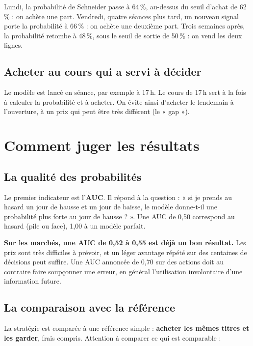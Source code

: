 \documentclass[11pt,a4paper]{article}
\begin{document}
\begin{exemple}
Lundi, la probabilité de Schneider passe à 64\,\%, au-dessus du seuil d'achat de 62\,\% : on
achète une part. Vendredi, quatre séances plus tard, un nouveau signal porte la probabilité
à 66\,\% : on achète une deuxième part. Trois semaines après, la probabilité retombe à
48\,\%, sous le seuil de sortie de 50\,\% : on vend les deux lignes.
\end{exemple}

\subsection{Acheter au cours qui a servi à décider}
Le modèle est lancé en séance, par exemple à 17\,h. Le cours de 17\,h sert à la fois à
calculer la probabilité et à acheter. On évite ainsi d'acheter le lendemain à
l'ouverture, à un prix qui peut être très différent (le « gap »).

\section{Comment juger les résultats}
\subsection{La qualité des probabilités}
Le premier indicateur est l'\textbf{AUC}. Il répond à la question : « si je prends au hasard
un jour de hausse et un jour de baisse, le modèle donne-t-il une probabilité plus forte au
jour de hausse ? ». Une AUC de 0,50 correspond au hasard (pile ou face), 1,00 à un modèle
parfait.

\textbf{Sur les marchés, une AUC de 0,52 à 0,55 est déjà un bon résultat.} Les prix sont
très difficiles à prévoir, et un léger avantage répété sur des centaines de décisions peut
suffire. Une AUC annoncée de 0,70 sur des actions doit au contraire faire soupçonner une
erreur, en général l'utilisation involontaire d'une information future.

\subsection{La comparaison avec la référence}
La stratégie est comparée à une référence simple : \textbf{acheter les mêmes titres et les
garder}, frais compris. Attention à comparer ce qui est comparable :
\end{document}
